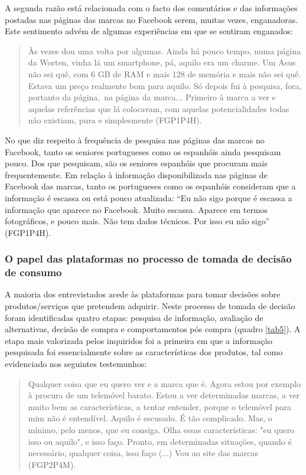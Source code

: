 \documentclass[portuguese]{textolivre}
\begin{document}
A segunda razão está relacionada com o facto dos comentários e das informações postadas nas páginas das marcas no Facebook serem, muitas vezes, enganadoras. Este sentimento advém de algumas experiências em que se sentiram enganados:

\begin{quote}
Às vezes dou uma volta por algumas. Ainda há pouco tempo, numa página da Worten, vinha lá um smartphone, pá, aquilo era um charme. Um Asus não sei quê, com 6 GB de RAM e mais 128 de memória e mais não sei quê. Estava um preço realmente bom para aquilo. Só depois fui à pesquisa, fora, portanto da página, na página da marca... Primeiro à marca a ver e aquelas referências que lá colocavam, com aquelas potencialidades todas não existiam, pura e simplesmente (FGP1P4H).
\end{quote}

No que diz respeito à frequência de pesquisa nas páginas das marcas no Facebook, tanto os seniores portugueses como os espanhóis ainda pesquisam pouco. Dos que pesquisam, são os seniores espanhóis que procuram mais frequentemente. Em relação à informação disponibilizada nas páginas de Facebook das marcas, tanto os portugueses como os espanhóis consideram que a informação é escassa ou está pouco atualizada: “Eu não sigo porque é escassa a informação que aparece no Facebook. Muito escassa. Aparece em termos fotográficos, e pouco mais. Não tem dados técnicos. Por isso eu não sigo” (FGP1P4H).

\subsubsection{O papel das plataformas no processo de tomada de decisão de consumo}
A maioria dos entrevistados acede às plataformas para tomar decisões sobre produtos/serviços que pretendem adquirir. Neste processo de tomada de decisão foram identificadas quatro etapas: pesquisa de informação, avaliação de alternativas, decisão de compra e comportamentos pós compra (quadro \ref{tab5}). A etapa mais valorizada pelos inquiridos foi a primeira em que a informação pesquisada foi essencialmente sobre as características dos produtos, tal como evidenciado nos seguintes testemunhos:

\begin{quote}
Qualquer coisa que eu quero ver e a marca que é. Agora estou por exemplo à procura de um telemóvel barato. Estou a ver determinadas marcas, a ver muito bem as características, a tentar entender, porque o telemóvel para mim não é entendível. Aquilo é escusado. É tão complicado. Mas, o mínimo, pelo menos, que eu consiga. Olha essas características: "eu quero isso ou aquilo", e isso faço. Pronto, em determinadas situações, quando é necessário, qualquer coisa, isso faço (...) Vou ao site das marcas (FGP2P4M).
\end{quote}
\end{document}
